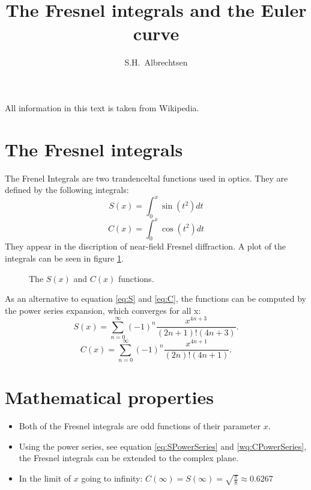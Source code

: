 \documentclass[twocolumn]{article}
\title{\vspace{-3.5cm}The Fresnel integrals and the Euler curve}
\author{S.H.~Albrechtsen}
\begin{document}
\maketitle
All information in this text is taken from Wikipedia\cite{WikiFresnelIntegral}.
\section{The Fresnel integrals}
The Frenel Integrals are two trandenceltal functions used in optics. They are defined by the following integrals:
\begin{equation}
S(x) = \int_{0}^{x} \sin(t^2) dt\label{eq:S}
\end{equation}
\begin{equation}
C(x) = \int_{0}^{x} \cos(t^2) dt\label{eq:C}
\end{equation}
They appear in the discription of near-field Fresnel diffraction. A plot of the integrals can be seen in figure \ref{fig:SandC}.

\begin{figure}
\centering

\caption{The $S(x)$ and $C(x)$ functions.\label{fig:SandC}}
\end{figure}

As an alternative to equation \ref{eq:S} and \ref{eq:C}, the functions can be computed by the power series expansion, which converges for all x:
\begin{equation}\label{eq:SPowerSeries}
S(x) = \sum_{n=0}^{\infty}(-1)^n\frac{x^{4n+3}}{(2n+1)!(4n+3)}.
\end{equation}
\begin{equation}\label{eq:CPowerSeries}
C(x) = \sum_{n=0}^{\infty}(-1)^n\frac{x^{4n+1}}{(2n)!(4n+1)}.
\end{equation}

\section{Mathematical properties}
\begin{itemize}
\item Both of the Fresnel integrals are odd functions of their parameter $x$.
\item Using the power series, see equation \ref{eq:SPowerSeries} and \ref{wq:CPowerSeries}, the Fresnel integrals can be extended to the complex plane.
\item In the limit of $x$ going to infinity: $C(\infty) = S(\infty) = \sqrt{\frac{\pi}{8}}\approx0.6267$
\end{itemize}
\end{document}
